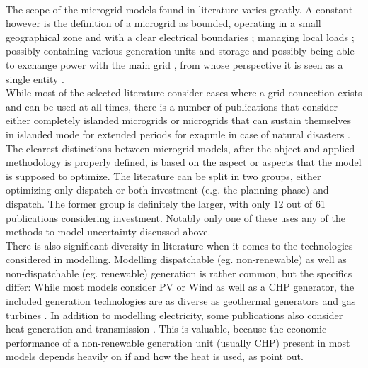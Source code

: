 \documentclass[
	11pt,								%
	DIV10,								%
	a4paper,         					%
	oneside,							%
	headheight=20pt,					%
	footheight=20pt,					%
    parskip=full,						%
    listof=totoc,						%
	bibliography=totoc,					%
	index=totoc,						%
]{scrartcl}
\begin{document}
\\
The scope of the microgrid models found in literature varies greatly. A constant however is the definition of a microgrid as bounded, operating in a small geographical zone and with a clear electrical boundaries \cite{TAVAKOLI20181}\cite{mashayekhMixedIntegerLinear2017}\cite{7853085}; managing local loads \cite{zhang2013efficient} \cite{ZHENG2018836}; possibly containing various generation units and storage \cite{silvente2015rolling}\cite{7741704} and possibly being able to exchange power with the main grid \cite{NEMATI2018944}\cite{SOLTANINEJADFARSANGI2018257}, from whose perspective it is seen as a single entity \cite{KOLTSAKLIS2018318}.
\\
While most of the selected literature consider cases where a grid connection exists and can be used at all times, there is a number of publications that consider either completely islanded microgrids \cite{ZHANG20181229}\cite{palma2013microgrid} \cite{6872087}\cite{7281564} or microgrids that can sustain themselves in islanded mode for extended periods for exapmle in case of natural disasters \cite{TAVAKOLI20181}.
\\
The clearest distinctions between microgrid models, after the object and applied methodology is properly defined, is based on the aspect or aspects that the model is supposed to optimize. The literature can be split in two groups, either optimizing only dispatch or both investment (e.g. the planning phase) and dispatch. The former group is definitely the larger, with only 12 out of 61 publications considering investment. Notably only one of these \cite{7540870} uses any of the methods to model uncertainty discussed above.
\\
There is also significant diversity in literature when it comes to the technologies considered in modelling.
Modelling dispatchable (eg. non-renewable) as well as non-dispatchable (eg. renewable) generation is rather common, but the specifics differ:
While most models consider PV or Wind as well as a CHP generator, the included generation technologies are as diverse as geothermal generators \cite{7975049} and gas turbines \cite{UMEOZOR2016272} \cite{NEMATI2018944}. In addition to modelling electricity, some publications also consider heat generation and transmission \cite{LAUINGER201624}\cite{wouters2015energy}. This is valuable, because the economic performance of a non-renewable generation unit (usually CHP) present in most models depends heavily on if and how the heat is used, as \cite{costa2014mixed} point out.
\\
\end{document}
